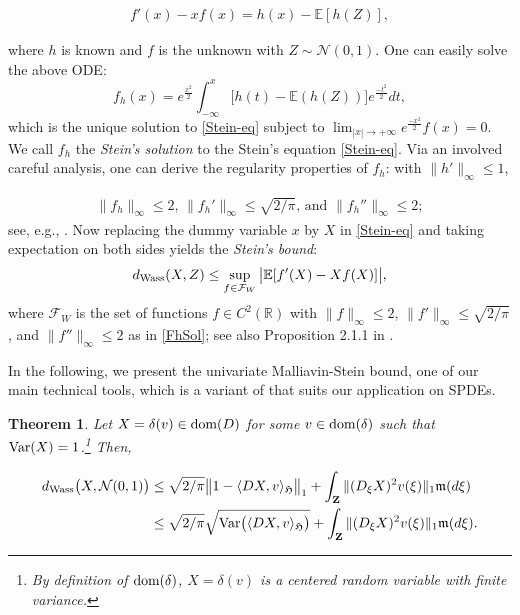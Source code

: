 \documentclass[letterpaper, 11pt,  reqno]{amsart}
\newtheorem{theorem}{Theorem} [section]
\newcommand{\noi}{\noindent}
\newcommand{\R}{\mathbb{R}}
\newcommand{\bE}{\mathbb{E}}
\newcommand{\E}{\mathbb{E}}
\newcommand{\F}{\mathcal{F}}
\newcommand{\cN}{\mathcal{N}}
\newcommand{\dl}{\delta}
\newcommand{\jb}[1]
{\langle #1 \rangle}
\newcommand{\Var}{\textup{Var}}
\newcommand{\fm}{\mathfrak{m}}
\newcommand{\fH}{\mathfrak{H}}
\newcommand{\dom}{\textup{dom}}
\numberwithin{equation}{section}
\numberwithin{theorem}{section}
\begin{document}
\noi
\begin{align}
\label{Stein-eq}
 f'(x) - x f(x)=  h(x)-\bE[h(Z)],
\end{align}

\noi
where  $h$ is known and $f$ is the unknown with $Z\sim\cN(0,1)$.
One can easily solve the above ODE:
\[
f_h(x) = e^{\frac{x^2}{2}} \int_{-\infty}^x \big[ h(t) - \E( h(Z) ) \big] e^{\frac{-t^2}{2}} dt,
\]
which is the unique solution to \eqref{Stein-eq} subject to 
$\lim_{|x|\to+\infty} e^{\frac{-x^2}{2}} f(x) =0$. We call $f_h$ the 
{\it Stein's solution} to  the Stein's equation  \eqref{Stein-eq}. 
Via an involved careful analysis, one can derive the regularity properties
of $f_h$: with $\|h'\|_\infty \leq 1$,

\noi
\begin{align} \label{FhSol}
\text{$\| f_h\|_\infty \leq 2 $, 
 $\|f_h'\|_\infty \leq \sqrt{2/\pi}$, and    $\|f_h''\|_\infty \leq 2$};
\end{align}
see, e.g.,   \cite[Lemma 2.5]{Ross11}. 
Now replacing the dummy variable $x$ by $X$ in \eqref{Stein-eq}
and taking  expectation on both sides yields the {\it Stein's bound}: 
\begin{align}\label{Stein_bdd}
d_{\rm Wass}(X, Z)
\leq \sup_{f\in\F_W} \big|  \bE[ f'(X) - Xf(X)]  \big|,
\end{align}
where $\F_W$ is the set of functions $f\in C^2(\R)$ with 
$\| f\|_\infty \leq 2 $, 
 $\|f'\|_\infty \leq \sqrt{2/\pi}$, and    $\|f''\|_\infty \leq 2$
 as in \eqref{FhSol}; see also Proposition 2.1.1 in \cite{GZ_thesis}.




In the following, we present  the univariate Malliavin-Stein bound,
one of our main technical tools,
which is  a variant of \cite[Theorem 3.1]{PSTU10}
that suits our application on SPDEs.



\begin{theorem}
\label{PSTU-new}
Let $X = \dl(v)\in\dom(D)$ for some $v\in \dom(\dl)$
such that $\Var(X)=1$.\footnote{By definition of $\dom(\dl)$, 
$X = \dl(v)$
is a centered random variable with finite variance. }
Then,  

\noi
\begin{align}
d_{\rm Wass} \big(  X, \cN(0,1) \big) 
&\leq  \sqrt{2/\pi}
 \big\|  1-\jb{DX, v}_{\fH}\big\|_1 
            +     \int_{\mathbf{Z}}  \|  (D_\xi X)^2  v(\xi) \|_1 \fm(d\xi)  \label{MSB1}  \\
 &\leq   \sqrt{2/\pi}  \sqrt{\Var\big(\jb{DX, v}_{\fH}\big)} 
     +     \int_{\mathbf{Z}}  \|  (D_\xi X)^2  v(\xi) \|_1 \fm(d\xi). \label{MSB2}
\end{align}
\end{theorem}
 
\end{document}
